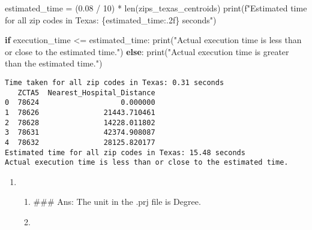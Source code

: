 \documentclass[
  letterpaper,
  DIV=11,
  numbers=noendperiod]{scrartcl}
\newenvironment{Shaded}{\begin{snugshade}}{\end{snugshade}}
\newcommand{\BuiltInTok}[1]{\textcolor[rgb]{0.00,0.23,0.31}{#1}}
\newcommand{\ControlFlowTok}[1]{\textcolor[rgb]{0.00,0.23,0.31}{\textbf{#1}}}
\newcommand{\DecValTok}[1]{\textcolor[rgb]{0.68,0.00,0.00}{#1}}
\newcommand{\FloatTok}[1]{\textcolor[rgb]{0.68,0.00,0.00}{#1}}
\newcommand{\NormalTok}[1]{\textcolor[rgb]{0.00,0.23,0.31}{#1}}
\newcommand{\OperatorTok}[1]{\textcolor[rgb]{0.37,0.37,0.37}{#1}}
\newcommand{\SpecialCharTok}[1]{\textcolor[rgb]{0.37,0.37,0.37}{#1}}
\newcommand{\SpecialStringTok}[1]{\textcolor[rgb]{0.13,0.47,0.30}{#1}}
\newcommand{\StringTok}[1]{\textcolor[rgb]{0.13,0.47,0.30}{#1}}
\begin{document}
\begin{Shaded}
\begin{Highlighting}[]
\NormalTok{estimated\_time }\OperatorTok{=}\NormalTok{ (}\FloatTok{0.08} \OperatorTok{/} \DecValTok{10}\NormalTok{) }\OperatorTok{*} \BuiltInTok{len}\NormalTok{(zips\_texas\_centroids)}
\BuiltInTok{print}\NormalTok{(}\SpecialStringTok{f"Estimated time for all zip codes in Texas: }\SpecialCharTok{\{}\NormalTok{estimated\_time}\SpecialCharTok{:.2f\}}\SpecialStringTok{ seconds"}\NormalTok{)}

\ControlFlowTok{if}\NormalTok{ execution\_time }\OperatorTok{\textless{}=}\NormalTok{ estimated\_time:}
    \BuiltInTok{print}\NormalTok{(}\StringTok{"Actual execution time is less than or close to the estimated time."}\NormalTok{)}
\ControlFlowTok{else}\NormalTok{:}
    \BuiltInTok{print}\NormalTok{(}\StringTok{"Actual execution time is greater than the estimated time."}\NormalTok{)}
\end{Highlighting}
\end{Shaded}

\begin{verbatim}
Time taken for all zip codes in Texas: 0.31 seconds
   ZCTA5  Nearest_Hospital_Distance
0  78624                   0.000000
1  78626               21443.710461
2  78628               14228.011802
3  78631               42374.908087
4  78632               28125.820177
Estimated time for all zip codes in Texas: 15.48 seconds
Actual execution time is less than or close to the estimated time.
\end{verbatim}

\begin{enumerate}
\def\labelenumi{\arabic{enumi}.}
\setcounter{enumi}{4}
\item
  \begin{enumerate}
  \def\labelenumii{\alph{enumii}.}
  \item
    \#\#\# Ans: The unit in the .prj file is Degree.
  \item
  \end{enumerate}
\end{enumerate}
\end{document}
